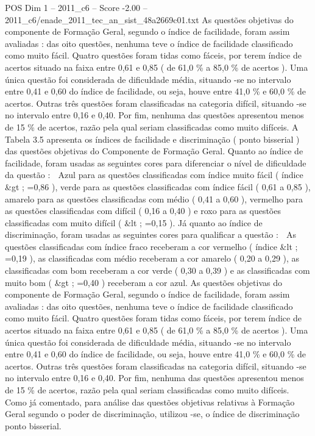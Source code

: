\begin{textsample}{POS Dim 1 – 2011\_c6 – Score -2.00 – 2011\_c6/enade\_2011\_tec\_an\_sist\_48a2669c01.txt}
As questões objetivas do componente de Formação Geral, segundo o índice de facilidade, foram assim avaliadas : das oito questões, nenhuma teve o índice de facilidade classificado como muito fácil.
Quatro questões foram tidas como fáceis, por terem índice de acertos situado na faixa entre 0,61 e 0,85 ( de 61,0 \% a 85,0 \% de acertos ).
Uma única questão foi considerada de dificuldade média, situando -se no intervalo entre 0,41 e 0,60 do índice de facilidade, ou seja, houve entre 41,0 \% e 60,0 \% de acertos.
Outras três questões foram classificadas na categoria difícil, situando -se no intervalo entre 0,16 e 0,40.
Por fim, nenhuma das questões apresentou menos de 15 \% de acertos, razão pela qual seriam classificadas como muito difíceis.
A Tabela 3.5 apresenta os índices de facilidade e discriminação ( ponto bisserial ) das questões objetivas do Componente de Formação Geral.
Quanto ao índice de facilidade, foram usadas as seguintes cores para diferenciar o nível de dificuldade da questão :  Azul para as questões classificadas com índice muito fácil ( índice \&gt ; =0,86 ), verde para as questões classificadas com índice fácil ( 0,61 a 0,85 ), amarelo para as questões classificadas com médio ( 0,41 a 0,60 ), vermelho para as questões classificadas com difícil ( 0,16 a 0,40 ) e roxo para as questões classificadas com muito difícil ( \&lt ; =0,15 ).
Já quanto ao índice de discriminação, foram usadas as seguintes cores para qualificar a questão :  As questões classificadas com índice fraco receberam a cor vermelho ( índice \&lt ; =0,19 ), as classificadas com médio receberam a cor amarelo ( 0,20 a 0,29 ), as classificadas com bom receberam a cor verde ( 0,30 a 0,39 ) e as classificadas com muito bom ( \&gt ; =0,40 ) receberam a cor azul.
As questões objetivas do componente de Formação Geral, segundo o índice de facilidade, foram assim avaliadas : das oito questões, nenhuma teve o índice de facilidade classificado como muito fácil.
Quatro questões foram tidas como fáceis, por terem índice de acertos situado na faixa entre 0,61 e 0,85 ( de 61,0 \% a 85,0 \% de acertos ).
Uma única questão foi considerada de dificuldade média, situando -se no intervalo entre 0,41 e 0,60 do índice de facilidade, ou seja, houve entre 41,0 \% e 60,0 \% de acertos.
Outras três questões foram classificadas na categoria difícil, situando -se no intervalo entre 0,16 e 0,40.
Por fim, nenhuma das questões apresentou menos de 15 \% de acertos, razão pela qual seriam classificadas como muito difíceis.
Como já comentado, para análise das questões objetivas relativas à Formação Geral segundo o poder de discriminação, utilizou -se, o índice de discriminação ponto bisserial.

\end{textsample}
